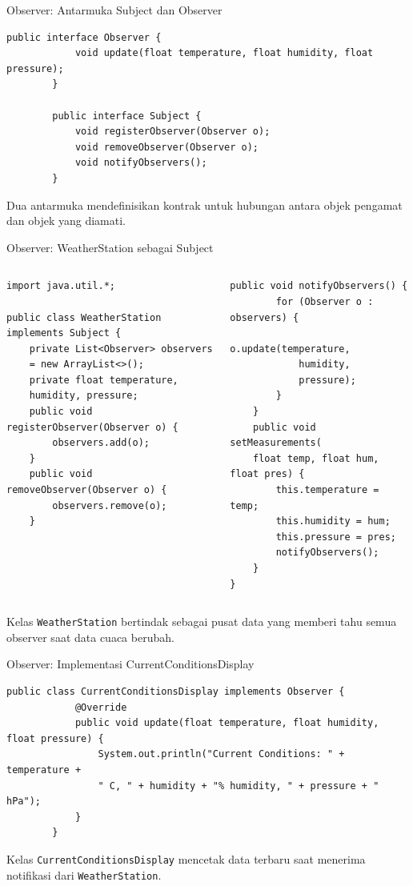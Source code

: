 \documentclass[aspectratio=169, table]{beamer}
\begin{document}
\begin{frame}[fragile]{Observer: Antarmuka Subject dan Observer}
	\begin{lstlisting}[style=JavaStyle]
		public interface Observer {
			void update(float temperature, float humidity, float pressure);
		}
		
		public interface Subject {
			void registerObserver(Observer o);
			void removeObserver(Observer o);
			void notifyObservers();
		}
	\end{lstlisting}
	\small Dua antarmuka mendefinisikan kontrak untuk hubungan antara objek pengamat dan objek yang diamati.
\end{frame}

\begin{frame}[fragile]{Observer: WeatherStation sebagai Subject}
	\vspace{10pt}
\begin{columns}[T]
\begin{lstlisting}[style=JavaStyle]
import java.util.*;

public class WeatherStation 
implements Subject {
	private List<Observer> observers 
	= new ArrayList<>();
	private float temperature, 
	humidity, pressure;
	public void registerObserver(Observer o) {
		observers.add(o);
	}
	public void removeObserver(Observer o) {
		observers.remove(o);
	}
\end{lstlisting}

\begin{lstlisting}[style=JavaStyle]
	public void notifyObservers() {
		for (Observer o : observers) {
			o.update(temperature, 
			humidity, 
			pressure);
		}
	}
	public void setMeasurements(
	float temp, float hum, float pres) {
		this.temperature = temp;
		this.humidity = hum;
		this.pressure = pres;
		notifyObservers();
	}
}
\end{lstlisting}
\end{columns}

\vspace{4pt}
\small Kelas \texttt{WeatherStation} bertindak sebagai pusat data yang memberi tahu semua observer saat data cuaca berubah.
\end{frame}


\begin{frame}[fragile]{Observer: Implementasi CurrentConditionsDisplay}
	\begin{lstlisting}[style=JavaStyle]
		public class CurrentConditionsDisplay implements Observer {
			@Override
			public void update(float temperature, float humidity, float pressure) {
				System.out.println("Current Conditions: " + temperature + 
				" C, " + humidity + "% humidity, " + pressure + " hPa");
			}
		}
	\end{lstlisting}
	\small Kelas \texttt{CurrentConditionsDisplay} mencetak data terbaru saat menerima notifikasi dari \texttt{WeatherStation}.
\end{frame}
\end{document}

